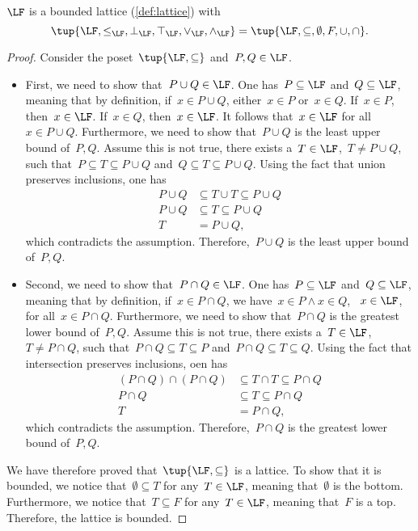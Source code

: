 \begin{lemma}
  $\LF$ is a bounded lattice (\cref{def:lattice}) with
  \begin{equation}
    \tup{\LF,\leq_{\LF},\bot_{\LF},\top_{\LF},\vee_{\LF},\wedge_{\LF}}=\tup{\LF,\subseteq,\emptyset,F,\cup,\cap}.
  \end{equation}
\end{lemma}
\begin{proof}
  Consider the poset~$\tup{\LF,\subseteq}$ and~$P,Q\in \LF$.
  \begin{itemize}
    \item First, we need to show that~$P\cup Q\in \LF$. One has~$P \subseteq \LF$ and~$Q\subseteq \LF$, meaning that by definition, if~$x\in P\cup Q$, either~$x\in P$ or~$x\in Q$. If~$x\in P$, then~$x\in \LF$. If~$x\in Q$, then~$x\in \LF$. It follows that~$x\in \LF$ for all~$x\in P\cup Q$. Furthermore, we need to show that~$P\cup Q$ is the least upper bound of~$P,Q$. Assume this is not true, \ie  there exists a~$T\in \LF$,~$T\neq P\cup Q$, such that~$P\subseteq T\subseteq P\cup Q$ and~$Q\subseteq T\subseteq P\cup Q$. Using the fact that union preserves inclusions, one has
    \begin{equation}
      \begin{aligned}
        P\cup Q &\subseteq T\cup T \subseteq P\cup Q\\
        P\cup Q &\subseteq T \subseteq P\cup Q\\
        T&= P\cup Q,
      \end{aligned}
    \end{equation}
    which contradicts the assumption. Therefore,~$P\cup Q$ is the least upper bound of~$P,Q$.
    \item Second, we need to show that~$P\cap Q\in \LF$. One has~$P\subseteq \LF$ and~$Q\subseteq \LF$, meaning that by definition, if~$x\in P\cap Q$, we have~$x\in P\wedge x\in Q$, \ie ~$x\in \LF$, for all~$x\in P\cap Q$. Furthermore, we need to show that~$P\cap Q$ is the greatest lower bound of~$P,Q$. Assume this is not true, \ie  there exists a~$T\in \LF$,~$T\neq P\cap Q$, such that~$P\cap Q\subseteq T\subseteq P$ and~$P\cap Q\subseteq T\subseteq Q$. Using the fact that intersection preserves inclusions, oen has
    \begin{equation}
      \begin{aligned}
      (P\cap Q)
        \cap (P\cap Q) &\subseteq T \cap T \subseteq P\cap Q\\
        P\cap Q &\subseteq T\subseteq P\cap Q\\
        T&=P\cap Q,
      \end{aligned}
    \end{equation}
    which contradicts the assumption. Therefore,~$P\cap Q$ is the greatest lower bound of~$P,Q$.
  \end{itemize}
  We have therefore proved that~$\tup{\LF,\subseteq}$ is a lattice. To show that it is bounded, we notice that~$\emptyset \subseteq T$ for any~$T\in \LF$, meaning that~$\emptyset$ is the bottom. Furthermore, we notice that~$T\subseteq F$ for any~$T\in \LF$, meaning that~$F$ is a top. Therefore, the lattice is bounded.
\end{proof}
